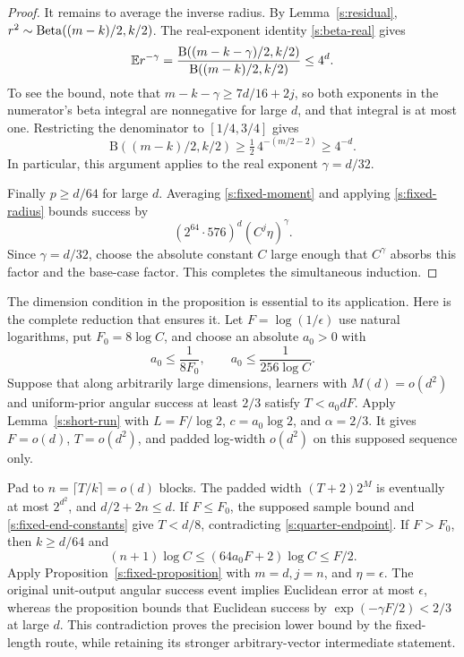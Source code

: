 \begin{proof}
It remains to average the inverse radius. By
Lemma~\ref{s:residual},
\(r^2\sim\operatorname{Beta}((m-k)/2,k/2)\). The real-exponent identity
\eqref{s:beta-real} gives
\begin{equation}\label{s:fixed-radius}
 \mathbb E r^{-\gamma}
 =\frac{\mathrm B((m-k-\gamma)/2,k/2)}
        {\mathrm B((m-k)/2,k/2)}
 \le4^d.
\end{equation}
To see the bound, note that
\(m-k-\gamma\ge7d/16+2j\), so both exponents in the numerator's
beta integral are nonnegative for large \(d\), and that integral is
at most one. Restricting the denominator to \([1/4,3/4]\) gives
\[
 \mathrm B((m-k)/2,k/2)
 \ge\tfrac12\,4^{-(m/2-2)}\ge4^{-d}.
\]
In particular, this argument applies to the real exponent
\(\gamma=d/32\).

Finally \(p\ge d/64\) for large \(d\). Averaging
\eqref{s:fixed-moment} and applying \eqref{s:fixed-radius} bounds
success by
\[
 (2^{64}\cdot576)^d(C^j\eta)^\gamma.
\]
Since \(\gamma=d/32\), choose the absolute constant \(C\) large
enough that \(C^\gamma\) absorbs this factor and the base-case
factor. This completes the simultaneous induction.
\end{proof}

The dimension condition in the proposition is essential to its
application. Here is the complete reduction that ensures it.
Let \(F=\log(1/\epsilon)\) use natural logarithms, put
\(F_0=8\log C\), and choose an absolute \(a_0>0\) with
\begin{equation}\label{s:fixed-end-constants}
 a_0\le\frac1{8F_0},\qquad a_0\le\frac1{256\log C}.
\end{equation}
Suppose that along arbitrarily large dimensions, learners with
\(M(d)=o(d^2)\) and uniform-prior angular success at least \(2/3\)
satisfy \(T<a_0dF\). Apply Lemma~\ref{s:short-run} with
\(L=F/\log2\), \(c=a_0\log2\), and \(\alpha=2/3\).
It gives \(F=o(d)\), \(T=o(d^2)\), and padded log-width
\(o(d^2)\) on this supposed sequence only.

Pad to \(n=\lceil T/k\rceil=o(d)\) blocks. The padded width
\((T+2)2^M\) is eventually at most \(2^{d^2}\), and
\(d/2+2n\le d\). If \(F\le F_0\), the supposed sample bound and
\eqref{s:fixed-end-constants} give \(T<d/8\), contradicting
\eqref{s:quarter-endpoint}. If \(F>F_0\), then \(k\ge d/64\) and
\[
 (n+1)\log C
 \le(64a_0F+2)\log C\le F/2.
\]
Apply Proposition~\ref{s:fixed-proposition} with \(m=d,j=n\), and
\(\eta=\epsilon\). The original unit-output angular success event
implies Euclidean error at most \(\epsilon\), whereas the proposition
bounds that Euclidean success by
\(\exp(-\gamma F/2)<2/3\) at large \(d\). This contradiction proves
the precision lower bound by the fixed-length route, while retaining
its stronger arbitrary-vector intermediate statement.
